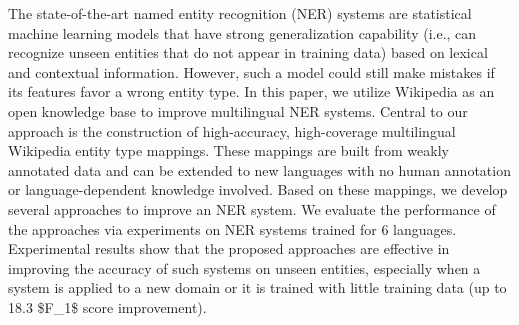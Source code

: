 The state-of-the-art named entity recognition (NER) systems are statistical machine learning models that have strong generalization capability (i.e., can recognize unseen entities that do not appear in training data) based on lexical and contextual information. However, such a model could still make mistakes if its features favor a wrong entity type. In this paper, we utilize Wikipedia as an open knowledge base to improve multilingual NER systems. Central to our approach is the construction of high-accuracy, high-coverage multilingual Wikipedia entity type mappings. These mappings are built from weakly annotated data and can be extended to new languages with no human annotation or language-dependent knowledge involved. Based on these mappings, we develop several approaches to improve an NER system. We evaluate the performance of the approaches via experiments on NER systems trained for 6 languages. Experimental results show that the proposed approaches are effective in improving the accuracy of such systems on unseen entities, especially when a system is applied to a new domain or it is trained with little training data (up to 18.3 \$F\_1\$ score improvement).
